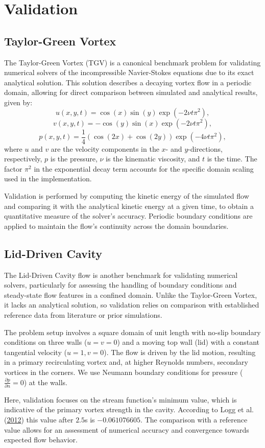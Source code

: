 \section{Validation}

\subsection{Taylor-Green Vortex}
The Taylor-Green Vortex (TGV) is a canonical benchmark problem for validating numerical solvers of the incompressible Navier-Stokes equations due to its exact analytical solution.
This solution describes a decaying vortex flow in a periodic domain, allowing for direct comparison between simulated and analytical results, given by:
\[
u(x, y, t) = \cos(x) \sin(y) \exp(-2 \nu t \pi^2),
\]
\[
v(x, y, t) = -\cos(y) \sin(x) \exp(-2 \nu t \pi^2),
\]
\[
p(x, y, t) = \frac{1}{4} \left( \cos(2x) + \cos(2y) \right) \exp(-4 \nu t \pi^2),
\]
where \( u \) and \( v \) are the velocity components in the \( x \)- and \( y \)-directions, respectively, \( p \) is the pressure, \( \nu \) is the kinematic viscosity, and \( t \) is the time.
The factor \( \pi^2 \) in the exponential decay term accounts for the specific domain scaling used in the implementation.

Validation is performed by computing the kinetic energy of the simulated flow and comparing it with the analytical kinetic energy at a given time, to obtain a quantitative measure of the solver's accuracy.
Periodic boundary conditions are applied to maintain the flow's continuity across the domain boundaries.

\subsection{Lid-Driven Cavity}

The Lid-Driven Cavity flow is another benchmark for validating numerical solvers, particularly for assessing the handling of boundary conditions and steady-state flow features in a confined domain.
Unlike the Taylor-Green Vortex, it lacks an analytical solution, so validation relies on comparison with established reference data from literature or prior simulations.

The problem setup involves a square domain of unit length with no-slip boundary conditions on three walls (\( u = v = 0 \)) and a moving top wall (lid) with a constant tangential velocity (\( u = 1, v = 0 \)).
The flow is driven by the lid motion, resulting in a primary recirculating vortex and, at higher Reynolds numbers, secondary vortices in the corners.
We use Neumann boundary conditions for pressure (\( \frac{\partial p}{\partial n} = 0 \)) at the walls.

Here, validation focuses on the stream function's minimum value, which is indicative of the primary vortex strength in the cavity.
According to Logg et al. (\href{https://doi.org/10.1007/978-3-642-23099-8}{2012}) this value after $2.5$s is $-0.061076605$.
The comparison with a reference value allows for an assessment of numerical accuracy and convergence towards expected flow behavior.
